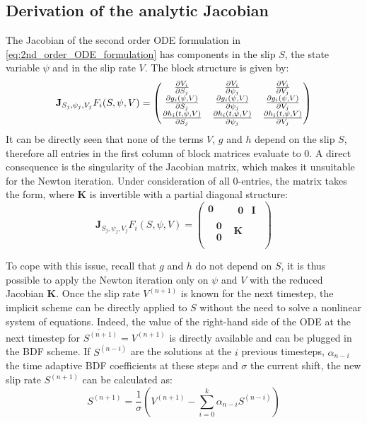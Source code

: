 \subsection{Derivation of the analytic Jacobian}
The Jacobian of the second order ODE formulation in \autoref{eq:2nd_order_ODE_formulation} has components in the slip $S$, the state variable $\psi$ and in the slip rate $V$. The block structure is given by:
\begin{equation}
\label{eq:Jacobian_2nd_order_ODE_formulation}
	\mathbf{J}_{S_j,\psi_j,V_j}F_i(S,\psi,V) = 	\begin{pmatrix}
	\pdv{V_i}{S_j} 				& \pdv{V_i}{\psi_j}	 			& \pdv{V_i}{V_j} \\
	\pdv{g_i(\psi,V)}{S_j} 		& \pdv{g_i(\psi,V)}{\psi_j}	 	& \pdv{g_i(\psi,V)}{V_j} \\
	\pdv{h_i(t,\psi,V)}{S_j} 	& \pdv{h_i(t,\psi,V)}{\psi_j} 	& \pdv{h_i(t,\psi,V)}{V_j}
\end{pmatrix}
\end{equation}
It can be directly seen that none of the terms $V$, $g$ and $h$ depend on the slip $S$, therefore all entries in the first column of block matrices evaluate to 0. A direct consequence is the singularity of the Jacobian matrix, which makes it unsuitable for the Newton iteration. Under consideration of all 0-entries, the matrix takes the form, where $\mathbf{K}$ is invertible with a partial diagonal structure:
\begin{equation}
\label{eq:Jacobian_2nd_order_ODE_formulation_with_zeros}
\mathbf{J}_{S_j,\psi_j,V_j}F_i(S,\psi,V) = 	\begin{pmatrix}
\mathbf{0} 												& \begin{matrix}\mathbf{0} & \mathbf{I} \end{matrix} \\
\;\,\begin{matrix}\mathbf{0} \\ \mathbf{0} \end{matrix} & \mathbf{K} 	\\
\end{pmatrix}
\end{equation}

To cope with this issue, recall that $g$ and $h$ do not depend on $S$, it is thus possible to apply the Newton iteration only on $\psi$ and $V$ with the reduced Jacobian $\mathbf{K}$. Once the slip rate $V^{(n+1)}$ is known for the next timestep, the implicit scheme can be directly applied to $S$ without the need to solve a nonlinear system of equations. Indeed, the value of the right-hand side of the ODE at the next timestep for $\dot{S^{(n+1)}} = V^{(n+1)}$ is directly available and can be plugged in the BDF scheme. If $S^{(n-i)}$ are the solutions at the $i$ previous timesteps, $\alpha_{n-i}$ the time adaptive BDF coefficients at these steps and $\sigma$ the current shift, the new slip rate $S^{(n+1)}$ can be calculated as: 
\begin{equation}
	\label{eq:update_S_2ndOrderODE}
	S^{(n+1)} = \frac{1}{\sigma}\left(V^{(n+1)} - \sum_{i=0}^{k}\alpha_{n-i}S^{(n-i)}\right)
\end{equation}


